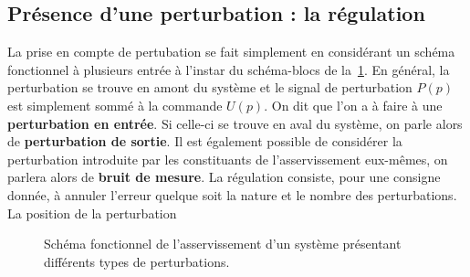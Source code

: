 \subsection{Présence d'une perturbation : la régulation}
La prise en compte de pertubation se fait simplement en considérant un schéma
fonctionnel à plusieurs entrée à l'instar du schéma-blocs de 
la~\cref{fig-pert2}. En général, la perturbation se trouve en amont
du système et le signal de perturbation $P(p)$ est simplement sommé à la 
commande $U(p)$. On dit que l'on a à faire à une \textbf{perturbation 
en entrée}. Si celle-ci se trouve en aval du système, on parle alors de 
\textbf{perturbation de sortie}. Il est également possible de considérer la 
perturbation introduite par les constituants de l'asservissement eux-mêmes, 
on parlera alors de \textbf{bruit de mesure}.
La régulation consiste, pour une consigne donnée, à annuler l'erreur 
quelque soit la nature et le nombre des perturbations.
%    
La position de la perturbation 

\begin{figure}[!h]
    \centering
    
    \caption{Schéma fonctionnel de l'asservissement d'un système 
             présentant différents types de perturbations. \label{fig-pert2}}
\end{figure}
